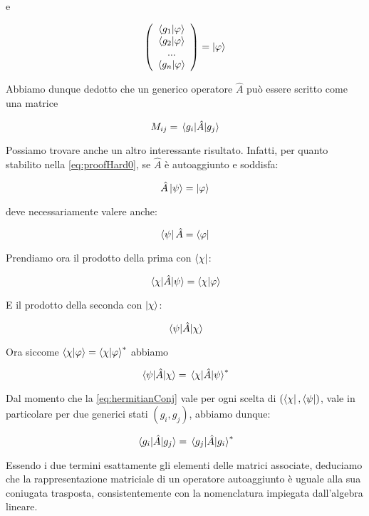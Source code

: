 e

	\begin{equation}
		\left ( \begin{array}{c}
				\braket{g_1}{\varphi} \\
				\braket{g_2}{\varphi} \\
				... \\
				\braket{g_n}{\varphi} \\
			\end{array}
		\right ) = \ket{\varphi}
	\end{equation}

Abbiamo dunque dedotto che un generico operatore $\hat{A}$ può essere scritto come una matrice

	\begin{equation} \label{eq:matricialFormOperator}
		M_{ij} = \mel{g_i}{\hat{A}}{g_j} 
	\end{equation}

	Possiamo trovare anche un altro interessante risultato. Infatti, per quanto stabilito nella \eqref{eq:proofHard0}, se $\hat{A}$ è autoaggiunto e soddisfa:
	
	\[
		\hat{A} \ket{\psi} = \ket{\varphi}
	\]
	
deve necessariamente valere anche:

	\[
		\bra{\psi} \hat{A} = \bra{\varphi}
	\]

Prendiamo ora il prodotto della prima con $\bra{\chi}$:

	\begin{equation}
		\mel{\chi}{\hat{A}}{\psi} = \braket{\chi}{\varphi}
	\end{equation}

E il prodotto della seconda con $\ket{\chi}$:

	\begin{equation}
		\mel{\psi}{\hat{A}}{\chi}
	\end{equation}

Ora siccome $\braket{\chi}{\varphi} = \braket{\chi}{\varphi}^*$ abbiamo

	\begin{equation} \label{eq:hermitianConj}
		\mel{\psi}{\hat{A}}{\chi} = \mel{\chi}{\hat{A}}{\psi}^*
	\end{equation}

	Dal momento che la \eqref{eq:hermitianConj} vale per ogni scelta di $(\bra{\chi}, \bra{\psi})$, vale in particolare per due generici stati $(g_i, g_j)$, abbiamo dunque:

	\begin{equation}
		\mel{g_i}{\hat{A}}{g_j} = \mel{g_j}{\hat{A}}{g_i}^*
	\end{equation}

Essendo i due termini esattamente gli elementi delle matrici associate, deduciamo che la rappresentazione matriciale di un operatore autoaggiunto è uguale alla sua coniugata trasposta, consistentemente con la nomenclatura impiegata dall'algebra lineare.
